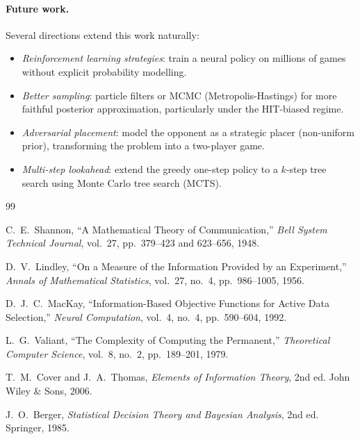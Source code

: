 \documentclass[12pt,a4paper]{article}
\newcommand{\1}{\mathbf{1}}
\begin{document}
\paragraph{Future work.}
Several directions extend this work naturally:
\begin{itemize}[nosep]
  \item \emph{Reinforcement learning strategies}: train a neural policy on
        millions of games without explicit probability modelling.
  \item \emph{Better sampling}: particle filters or MCMC (Metropolis-Hastings)
        for more faithful posterior approximation, particularly under the
        HIT-biased regime.
  \item \emph{Adversarial placement}: model the opponent as a strategic placer
        (non-uniform prior), transforming the problem into a two-player game.
  \item \emph{Multi-step lookahead}: extend the greedy one-step policy to a
        $k$-step tree search using Monte Carlo tree search (MCTS).
\end{itemize}


\begin{thebibliography}{99}

C.~E.~Shannon,
\newblock ``A Mathematical Theory of Communication,''
\newblock \emph{Bell System Technical Journal}, vol.~27, pp.~379--423 and
  623--656, 1948.

D.~V.~Lindley,
\newblock ``On a Measure of the Information Provided by an Experiment,''
\newblock \emph{Annals of Mathematical Statistics}, vol.~27, no.~4,
  pp.~986--1005, 1956.

D.~J.~C.~MacKay,
\newblock ``Information-Based Objective Functions for Active Data Selection,''
\newblock \emph{Neural Computation}, vol.~4, no.~4, pp.~590--604, 1992.

L.~G.~Valiant,
\newblock ``The Complexity of Computing the Permanent,''
\newblock \emph{Theoretical Computer Science}, vol.~8, no.~2, pp.~189--201,
  1979.

T.~M.~Cover and J.~A.~Thomas,
\newblock \emph{Elements of Information Theory}, 2nd ed.
\newblock John Wiley \& Sons, 2006.

J.~O.~Berger,
\newblock \emph{Statistical Decision Theory and Bayesian Analysis}, 2nd ed.
\newblock Springer, 1985.

\end{thebibliography}
\end{document}
